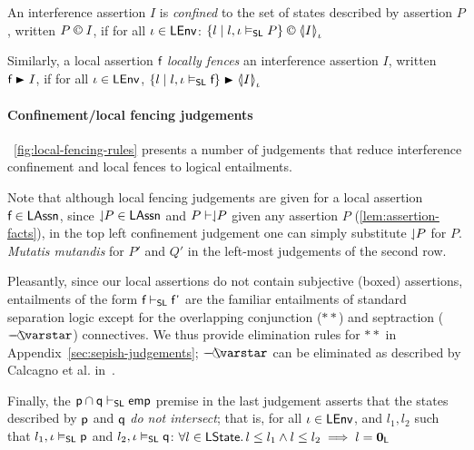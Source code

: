%
%
\begin{definition}
An interference assertion $I$ is \emph{confined} to the set of states described by assertion $P$, written $P \confines I$, if for all $\iota \in \mathsf{LEnv}$:
%
\qquad
$
	\left\{l \mid l, \lenv \slsat P \right\} \confines \semI[\lenv]{I}
$
%

\noindent Similarly, a local assertion $\lass{f}$ \emph{locally fences} an interference assertion $I$, written $\lass{f} \strictfences I$, if for all $\iota \in \mathsf{LEnv}$,
%
\qquad
$
	\left\{l \mid l, \lenv \slsat \lass{F} \right\} \strictfences \semI[\lenv]{I}
$
%
\end{definition}
%

\paragraph{\textbf{Confinement/local fencing judgements}}\fig~\ref{fig:local-fencing-rules} presents a number of judgements that reduce interference confinement and local fences to logical entailments. 

Note that although local fencing judgements are given for a local assertion $\lass{f} \in \LAssertions$, since $\downharpoonleft\!\! P \in \mathsf{LAssn}$ and $P \vdash \downharpoonleft\!\! P$ given any assertion $P$ (\lem\ref{lem:assertion-facts}), in the top left confinement judgement one can simply substitute $\downharpoonleft\!\! P$ for $P$. \textit{Mutatis mutandis} for $P'$ and $Q'$ in the left-most judgements of the second row.

Pleasantly, since our local assertions do not contain subjective (boxed) assertions, entailments of the form $\lass{f} \slentails \lass{f'}$ are the familiar entailments of standard separation logic except for the overlapping conjunction ($**$) and septraction ($\septraction$) connectives. We thus provide elimination rules for $**$ in Appendix~\ref{sec:sepish-judgements}; $\septraction$ can be eliminated as described by Calcagno et al. in~\cite{vv07msc}.

Finally, the $\separate{\lass{P}}{\lass{Q}}$ premise in the last judgement asserts that the states described by $\lass{P}$ and $\lass{Q}$ \emph{do not intersect}; that is, for all $\iota \in \mathsf{LEnv}$, and $l_1, l_2$ such that $l_1, \lenv \slsat \lass{p}$ and $l_2, \lenv \slsat \lass{Q}$: 
%
\qquad
$
	\forall l \in \mathsf{LState}.\, l \leq l_1 \land l \leq l_2 \implies l = \mathbf{0}_{\mathsf{L}}
$
%

